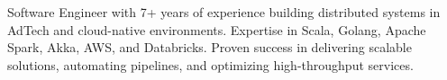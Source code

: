 \documentclass[9pt]{extletter}
\begin{document}
\maketitle


Software Engineer with 7+ years of experience building distributed systems in AdTech and cloud-native environments.
Expertise in Scala, Golang, Apache Spark, Akka, AWS, and Databricks.
Proven success in delivering scalable solutions, automating pipelines, and optimizing high-throughput services.


\end{document}
